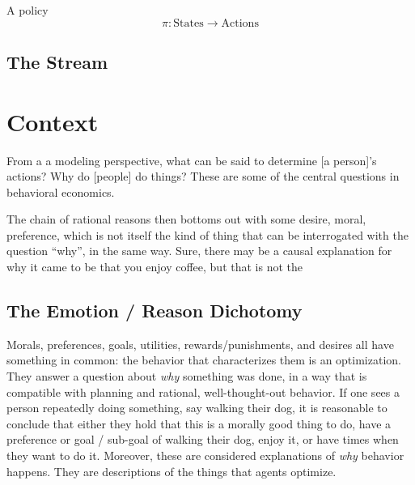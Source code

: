 \documentclass{book}
\begin{document}
	A policy
		\[ \pi: \mathrm{States} \to \mathrm{Actions} \]
	
	
	
	\section{The Stream}

	\chapter{Context}
	From a a modeling perspective, what can be said to determine [a person]'s actions? Why do [people] do things? These are some of the central questions in behavioral economics. 
	
	
%			
	
	The chain of rational reasons then bottoms out with some desire, moral, preference, which is not itself the kind of thing that can be interrogated with the question ``why'', in the same way. Sure, there may be a causal explanation for why it came to be that you enjoy coffee, but that is not the 
	
	
			
	
	
	
	
	\section{The Emotion / Reason Dichotomy}
	Morals, preferences, goals, utilities, rewards/punishments, and desires all have something in common: the behavior that characterizes them is an optimization. They answer a question about \emph{why} something was done, in a way that is compatible with planning and rational, well-thought-out behavior. If one sees a person repeatedly doing something, say walking their dog, it is reasonable to conclude that either they hold that this is a morally good thing to do, have a preference or goal / sub-goal of walking their dog, enjoy it, or have times when they want to do it. Moreover, these are considered explanations of \emph{why} behavior happens. They are descriptions of the things that agents optimize.
	
\end{document}
